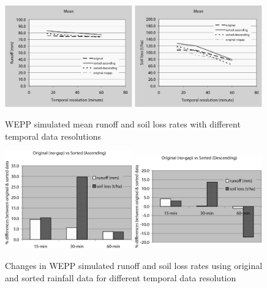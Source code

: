 \begin{figure}[htbp]
  \centering
    \includegraphics[width=0.49\textwidth]{./img/wepp_mean_runoff}
    \includegraphics[width=0.49\textwidth]{./img/wepp_mean_soilloss}
  \caption{WEPP simulated mean runoff and soil loss rates with different
temporal data resolutions}
  \label{fig:wepp_mean_runoff_soilloss_diff}
\end{figure}

\begin{figure}[htbp]
  \centering
    \includegraphics[width=0.49\textwidth]{./img/wepp_diff_runoff_soilloss_asc}
    \includegraphics[width=0.49\textwidth]{./img/wepp_diff_runoff_soilloss_des}
  \caption{Changes in WEPP simulated runoff and soil loss rates using original
and sorted rainfall data for different temporal data resolution}
  \label{fig:wepp_diff_runoff_soilloss}
\end{figure}

